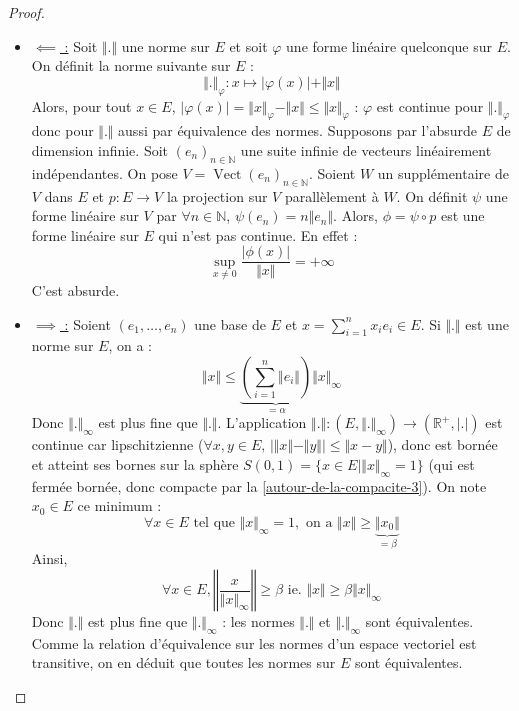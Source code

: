   \begin{proof}
    \begin{itemize}
      \item \uline{$\impliedby$ :} Soit $\Vert . \Vert$ une norme sur $E$ et soit $\varphi$ une forme linéaire quelconque sur $E$. On définit la norme suivante sur $E$ :
      \[ \Vert . \Vert_{\varphi} : x \mapsto \vert \varphi(x) \vert + \Vert x \Vert \]
      Alors, pour tout $x \in E$, $\vert \varphi(x) \vert = \Vert x \Vert_{\varphi} - \Vert x \Vert \leq \Vert x \Vert_{\varphi}$ : $\varphi$ est continue pour $\Vert . \Vert_{\varphi}$ donc pour $\Vert . \Vert$ aussi par équivalence des normes.
      \newpar
      Supposons par l'absurde $E$ de dimension infinie. Soit $(e_n)_{n \in \mathbb{N}}$ une suite infinie de vecteurs linéairement indépendantes. On pose $V = \operatorname{Vect}(e_n)_{n \in \mathbb{N}}$. Soient $W$ un supplémentaire de $V$ dans $E$ et $p : E \rightarrow V$ la projection sur $V$ parallèlement à $W$. On définit $\psi$ une forme linéaire sur $V$ par $\forall n \in \mathbb{N}$, $\psi (e_n) = n \Vert e_n \Vert$. Alors, $\phi = \psi \circ p$ est une forme linéaire sur $E$ qui n'est pas continue. En effet :
      \[ \sup_{x \neq 0} \frac{\vert \phi(x) \vert}{\Vert x \Vert} = +\infty \]
      C'est absurde.
      \item \uline{$\implies$ :}
      Soient $(e_1, \dots, e_n)$ une base de $E$ et $x = \sum_{i=1}^n x_i e_i \in E$. Si $\Vert . \Vert$ est une norme sur $E$, on a :
      \[ \Vert x \Vert \leq \underbrace{\left( \sum_{i=1}^n \Vert e_i \Vert \right)}_{= \alpha} \Vert x \Vert_\infty \]
      Donc $\Vert . \Vert_\infty$ est plus fine que $\Vert . \Vert$.
      \newpar
      L'application $\Vert . \Vert : (E, \Vert . \Vert_\infty) \rightarrow (\mathbb{R}^+, \vert . \vert)$ est continue car lipschitzienne ($\forall x, y \in E, \, \vert \Vert x \Vert - \Vert y \Vert \vert \leq \Vert x - y \Vert$), donc est bornée et atteint ses bornes sur la sphère $S(0,1) = \{ x \in E \mid \Vert x \Vert_\infty = 1 \}$ (qui est fermée bornée, donc compacte par la \cref{autour-de-la-compacite-3}). On note $x_0 \in E$ ce minimum :
      \[ \forall x \in E \text{ tel que } \Vert x \Vert_\infty = 1, \text{ on a } \Vert x \Vert \geq \underbrace{\Vert x_0 \Vert}_{= \beta} \]
      Ainsi,
      \[ \forall x \in E, \left\Vert \frac{x}{\Vert x \Vert_\infty} \right\Vert \geq \beta \text{ ie. } \Vert x \Vert \geq \beta \Vert x \Vert_\infty \]
      Donc $\Vert . \Vert$ est plus fine que $\Vert . \Vert_\infty$ : les normes $\Vert . \Vert$ et $\Vert . \Vert_\infty$ sont équivalentes. Comme la relation d'équivalence sur les normes d'un espace vectoriel est transitive, on en déduit que toutes les normes sur $E$ sont équivalentes.
    \end{itemize}
  \end{proof}

